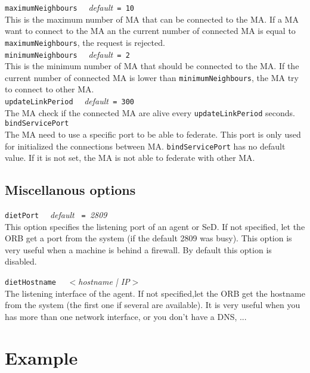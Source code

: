 \noindent
\texttt{maximumNeighbours} \ \ \emph{default}\texttt{ = 10}\\ This is
the maximum number of MA that can be connected to the MA. If a MA want
to connect to the MA an the current number of connected MA is equal to
\texttt{maximumNeighbours}, the request is rejected.\\

\noindent
\texttt{minimumNeighbours} \ \ \emph{default}\texttt{ = 2}\\ This is
the minimum number of MA that should be connected to the MA. If the
current number of connected MA is lower than
\texttt{minimumNeighbours}, the MA try to connect to other MA.\\

\noindent
\texttt{updateLinkPeriod} \ \ \emph{default}\texttt{ = 300}\\ The MA
check if the connected MA are alive every \texttt{updateLinkPeriod}
seconds.\\

\noindent
\texttt{bindServicePort}\\ The MA need to use a specific port to be
able to federate. This port is only used for initialized the
connections between MA. \texttt{bindServicePort} has no default
value. If it is not set, the MA is not able to federate with other
MA.\\

\subsection{Miscellanous options}

\noindent
\texttt{dietPort} \ \ \emph{default} \texttt{ = }\emph{2809}\\ This
option specifies the listening port of an agent or SeD. If not
specified, let the ORB get a port from the system (if the default 2809
was busy). This option is very useful when a machine is behind a
firewall. By default this option is disabled.

\noindent
\texttt{dietHostname} \ \ \emph{$<$hostname |  IP$>$}\\ The listening
interface of the agent. If not specified,let the ORB get the hostname
from the system (the first one if several are available).  It is very
useful when you has more than one network interface, or you don't have
a DNS, ...

\section{Example}
\label{sec:deploy_ex}

